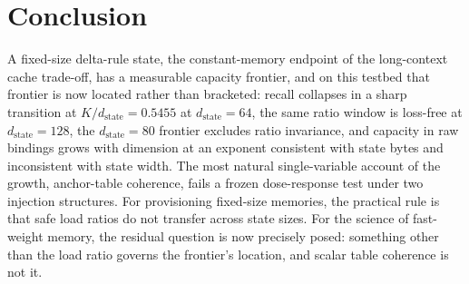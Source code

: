\section{Conclusion}
\label{sec:conclusion}

A fixed-size delta-rule state, the constant-memory endpoint of the
long-context cache trade-off, has a measurable capacity frontier, and on
this testbed that frontier is now located rather than bracketed: recall
collapses in a sharp transition at $K/d_{\mathrm{state}} = 0.5455$ at
$d_{\mathrm{state}} = 64$, %
the same ratio window is loss-free at $d_{\mathrm{state}} = 128$,
the $d_{\mathrm{state}} = 80$ frontier excludes ratio invariance,
and capacity in raw bindings grows with dimension at an exponent
consistent with state bytes and inconsistent with state width.
The most natural single-variable account of the growth, anchor-table
coherence, fails a frozen dose-response test under two injection
structures. %
For provisioning fixed-size memories, the practical rule is that safe
load ratios do not transfer across state sizes. For the science of
fast-weight memory, the residual question is now precisely posed:
something other than the load ratio governs the frontier's location, and
scalar table coherence is not it.
